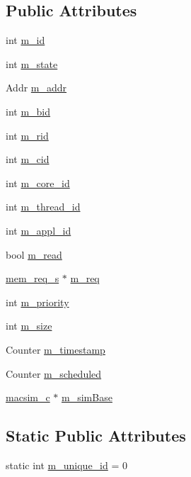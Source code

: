 \subsection*{Public Attributes}
\begin{DoxyCompactItemize}
\item 
int \hyperlink{structdrb__entry__s_af2230e8e5cbc01c5d1d36e7bd9ff2baf}{m\_\-id}
\item 
int \hyperlink{structdrb__entry__s_ae4be988b683e61a224097314c628fd2f}{m\_\-state}
\item 
Addr \hyperlink{structdrb__entry__s_a0f1460584c1177374f945ff1a3a54002}{m\_\-addr}
\item 
int \hyperlink{structdrb__entry__s_a432a11793c38396a9dcaa721b4558be5}{m\_\-bid}
\item 
int \hyperlink{structdrb__entry__s_ae2b908fe6d45df4e87ff9311cb3a7cb3}{m\_\-rid}
\item 
int \hyperlink{structdrb__entry__s_a87cb70765e32b180691044cfbbfd2a68}{m\_\-cid}
\item 
int \hyperlink{structdrb__entry__s_ab497c914977561ea3f790b90a80fcbea}{m\_\-core\_\-id}
\item 
int \hyperlink{structdrb__entry__s_a9c4047d6412445c6d01df388fef1a761}{m\_\-thread\_\-id}
\item 
int \hyperlink{structdrb__entry__s_addc71155d0dc3d0b0a808fbbab7de012}{m\_\-appl\_\-id}
\item 
bool \hyperlink{structdrb__entry__s_a209735d05c8d951ac9f4b7df8ef19ea6}{m\_\-read}
\item 
\hyperlink{structmem__req__s}{mem\_\-req\_\-s} $\ast$ \hyperlink{structdrb__entry__s_ae49002fe9eceba05d97cf23ddcceeaea}{m\_\-req}
\item 
int \hyperlink{structdrb__entry__s_a09a64c18e0299a6390ca456c08de7e31}{m\_\-priority}
\item 
int \hyperlink{structdrb__entry__s_a9c9e5421e638131d5cb0873b54132254}{m\_\-size}
\item 
Counter \hyperlink{structdrb__entry__s_a3d8d1a01bae3ed44b066762fc7b06986}{m\_\-timestamp}
\item 
Counter \hyperlink{structdrb__entry__s_a967c6ecd056b73b1775bf150d9bef358}{m\_\-scheduled}
\item 
\hyperlink{classmacsim__c}{macsim\_\-c} $\ast$ \hyperlink{structdrb__entry__s_acf3a8b744c9a0e9e6913668c857708c3}{m\_\-simBase}
\end{DoxyCompactItemize}
\subsection*{Static Public Attributes}
\begin{DoxyCompactItemize}
\item 
static int \hyperlink{structdrb__entry__s_a8023e241d97559b802aed5ded291097b}{m\_\-unique\_\-id} = 0
\end{DoxyCompactItemize}


